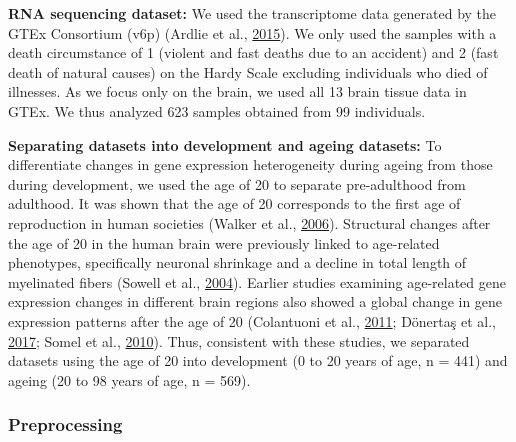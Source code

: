 \documentclass[12pt,twoside]{unicam}
\begin{document}
\textbf{RNA sequencing dataset:} We used the transcriptome data generated by the GTEx Consortium (v6p) (Ardlie et al., \protect\hyperlink{ref-Ardlie2015}{2015}). We only used the samples with a death circumstance of 1 (violent and fast deaths due to an accident) and 2 (fast death of natural causes) on the Hardy Scale excluding individuals who died of illnesses. As we focus only on the brain, we used all 13 brain tissue data in GTEx. We thus analyzed 623 samples obtained from 99 individuals.

\textbf{Separating datasets into development and ageing datasets:} To differentiate changes in gene expression heterogeneity during ageing from those during development, we used the age of 20 to separate pre-adulthood from adulthood. It was shown that the age of 20 corresponds to the first age of reproduction in human societies (Walker et al., \protect\hyperlink{ref-Walker2006}{2006}). Structural changes after the age of 20 in the human brain were previously linked to age-related phenotypes, specifically neuronal shrinkage and a decline in total length of myelinated fibers (Sowell et al., \protect\hyperlink{ref-Sowell2004}{2004}). Earlier studies examining age-related gene expression changes in different brain regions also showed a global change in gene expression patterns after the age of 20 (Colantuoni et al., \protect\hyperlink{ref-Colantuoni2011}{2011}; Dönertaş et al., \protect\hyperlink{ref-Donertas2017}{2017}; Somel et al., \protect\hyperlink{ref-Somel2010}{2010}). Thus, consistent with these studies, we separated datasets using the age of 20 into development (0 to 20 years of age, n = 441) and ageing (20 to 98 years of age, n = 569).

\hypertarget{preprocessing}{%
\subsubsection{Preprocessing}\label{preprocessing}}
\end{document}
